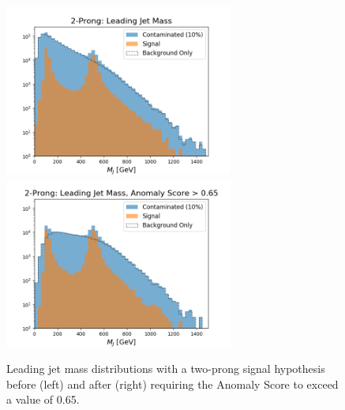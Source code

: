 \documentclass[11pt, a4paper]{article}
\begin{document}
\begin{figure}[H]
	\begin{center}
		\includegraphics[width=213pt]{imgs/bugfix/2Prong_Contaminated_10p0_J_Mass_Multi_Lead_SaveForPaper.png}
		\includegraphics[width=213pt]{imgs/bugfix/2Prong_Contaminated_10p0_J_Mass_AnomScore0p65_Multi_Lead_SaveForPaper.png}
	\end{center}
	\caption{Leading jet mass distributions with a two-prong signal hypothesis before (left) and after (right) requiring the Anomaly Score to exceed a value of 0.65.}
	\label{fig:2P_lj_mass}
\end{figure}
\end{document}
